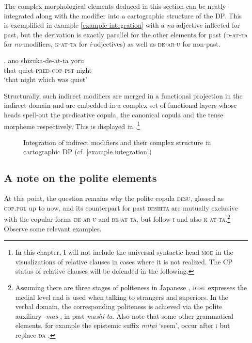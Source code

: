 The complex morphological elements deduced in this section can be neatly integrated along with the modifier into a cartographic structure of the DP. This is exemplified in example \ref{example integration} with a \textit{na}-adjective inflected for past, but the derivation is exactly parallel for the other elements for past (\textsc{d-at-ta} for \textit{no}-modifiers, \textsc{k-at-ta} for \textit{i}-adjectives) as well as \textsc{de-ar-u} for non-past.

\exg. ano shizuka-de-at-ta yoru\\
that quiet-\textsc{pred-cop-pst} night\\
`that night which was quiet' \label{example integration}

Structurally, such indirect modifiers are merged in a functional projection in the indirect domain and are embedded in a complex set of functional layers whose heads spell-out the predicative copula, the canonical copula and the tense morpheme respectively. This is displayed in .\footnote{In this chapter, I will not include the universal syntactic head \textsc{mod} in the visualizations of relative clauses in cases where it is not realized. The CP status of relative clauses will be defended in the following.}

\begin{figure}[b]
\centering
{}
\caption{Integration of indirect modifiers and their complex structure in cartographic DP (cf. \ref{example integration})}
\label{cartographic tree indirect modifiers}
\end{figure}

\subsection{A note on the polite elements} \label{desu}

At this point, the question remains why the polite copula \textsc{desu}, glossed as \textsc{cop.pol} up to now, and its counterpart for past \textsc{deshita} are mutually exclusive with the copular forms \textsc{de-ar-u} and \textsc{de-at-ta}, but follow \textsc{i} and also \textsc{k-at-ta}.\footnote{Assuming there are three stages of politeness in Japanese \citep{minami.1977:gendai}, \textsc{desu} expresses the medial level and is used when talking to strangers and superiors. In the verbal domain, the corresponding politeness is achieved via the polite auxiliary -\textit{mas}-, in past \textit{mashi-ta}. Also note that some other grammatical elements, for example the epistemic suffix \textit{mitai} `seem’, occur after \textsc{i} but replace \textsc{da} \citep{kubo:1992:japanese, urushibara:1993:syntactic, nishiyama:1999:adj}.} Observe some relevant examples.

